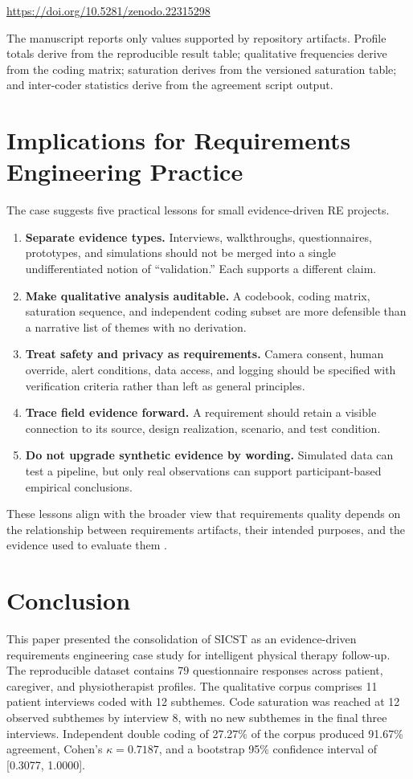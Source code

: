 \documentclass[10pt,a4paper]{article}
\begin{document}
\begin{center}
\url{https://doi.org/10.5281/zenodo.22315298}
\end{center}

The manuscript reports only values supported by repository artifacts. Profile totals derive from the reproducible result table; qualitative frequencies derive from the coding matrix; saturation derives from the versioned saturation table; and inter-coder statistics derive from the agreement script output.

\section{Implications for Requirements Engineering Practice}
The case suggests five practical lessons for small evidence-driven RE projects.

\begin{enumerate}[leftmargin=*]
\item \textbf{Separate evidence types.} Interviews, walkthroughs, questionnaires, prototypes, and simulations should not be merged into a single undifferentiated notion of ``validation.'' Each supports a different claim.
\item \textbf{Make qualitative analysis auditable.} A codebook, coding matrix, saturation sequence, and independent coding subset are more defensible than a narrative list of themes with no derivation.
\item \textbf{Treat safety and privacy as requirements.} Camera consent, human override, alert conditions, data access, and logging should be specified with verification criteria rather than left as general principles.
\item \textbf{Trace field evidence forward.} A requirement should retain a visible connection to its source, design realization, scenario, and test condition.
\item \textbf{Do not upgrade synthetic evidence by wording.} Simulated data can test a pipeline, but only real observations can support participant-based empirical conclusions.
\end{enumerate}

These lessons align with the broader view that requirements quality depends on the relationship between requirements artifacts, their intended purposes, and the evidence used to evaluate them \citep{grosser2024templates,knauss2018clarification}.

\section{Conclusion}
This paper presented the consolidation of SICST as an evidence-driven requirements engineering case study for intelligent physical therapy follow-up. The reproducible dataset contains 79 questionnaire responses across patient, caregiver, and physiotherapist profiles. The qualitative corpus comprises 11 patient interviews coded with 12 subthemes. Code saturation was reached at 12 observed subthemes by interview 8, with no new subthemes in the final three interviews. Independent double coding of 27.27\% of the corpus produced 91.67\% agreement, Cohen's $\kappa=0.7187$, and a bootstrap 95\% confidence interval of [0.3077, 1.0000].
\end{document}
